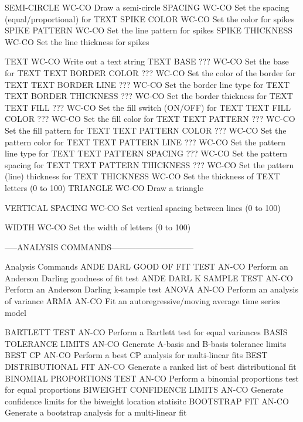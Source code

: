 SEMI-CIRCLE                 WC-CO Draw a semi-circle
SPACING                     WC-CO Set the spacing (equal/proportional) for TEXT
SPIKE COLOR                 WC-CO Set the color for spikes
SPIKE PATTERN               WC-CO Set the line pattern for spikes
SPIKE THICKNESS             WC-CO Set the line thickness for spikes

TEXT                        WC-CO Write out a text string
TEXT BASE              ???  WC-CO Set the base for TEXT
TEXT BORDER COLOR      ???  WC-CO Set the color of the border for TEXT
TEXT BORDER LINE       ???  WC-CO Set the border line type for TEXT
TEXT BORDER THICKNESS  ???  WC-CO Set the border thickness for TEXT
TEXT FILL              ???  WC-CO Set the fill switch (ON/OFF) for TEXT
TEXT FILL COLOR        ???  WC-CO Set the fill color for TEXT
TEXT PATTERN           ???  WC-CO Set the fill pattern for TEXT
TEXT PATTERN COLOR     ???  WC-CO Set the pattern color for TEXT
TEXT PATTERN LINE      ???  WC-CO Set the pattern line type for TEXT
TEXT PATTERN SPACING   ???  WC-CO Set the pattern spacing for TEXT
TEXT PATTERN THICKNESS ???  WC-CO Set the pattern (line) thickness for TEXT
THICKNESS                   WC-CO Set the thickness of TEXT letters (0 to 100)
TRIANGLE                    WC-CO Draw a triangle

VERTICAL SPACING            WC-CO Set vertical spacing between lines (0 to 100)

WIDTH                       WC-CO Set the width of letters (0 to 100)

-----ANALYSIS COMMANDS------------------------------

Analysis Commands
ANDE DARL GOOD OF FIT TEST  AN-CO Perform an Anderson Darling goodness of fit test
ANDE DARL K SAMPLE TEST     AN-CO Perform an Anderson Darling k-sample test
ANOVA                       AN-CO Perform an analysis of variance
ARMA                        AN-CO Fit an autoregressive/moving average time series model

BARTLETT TEST               AN-CO Perform a Bartlett test for equal variances
BASIS TOLERANCE LIMITS      AN-CO Generate A-basis and B-basis tolerance limits
BEST CP                     AN-CO Perform a best CP analysis for multi-linear fits
BEST DISTRIBUTIONAL FIT     AN-CO Generate a ranked list of best distributional fit
BINOMIAL PROPORTIONS TEST   AN-CO Perform a binomial proportions test for equal proportions
BIWEIGHT CONFIDENCE LIMITS  AN-CO Generate confidence limits for the biweight location statisitc
BOOTSTRAP FIT               AN-CO Generate a bootstrap analysis for a multi-linear fit

